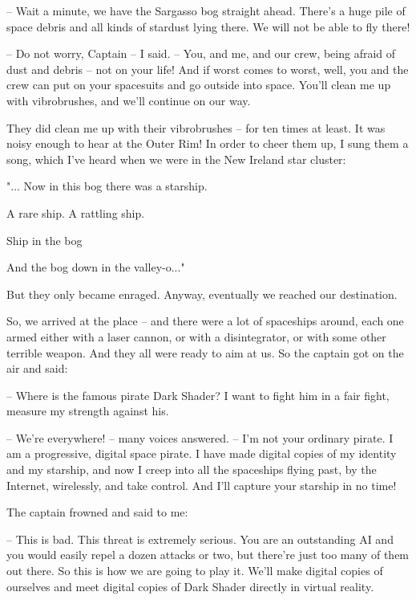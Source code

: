 \documentclass[ebook,twoside,final,openright]{memoir}
\begin{document}
– Wait a minute, we have the Sargasso bog straight ahead. There's a huge pile of space debris and all kinds of stardust lying there. We will not be able to fly there!\par
– Do not worry, Captain – I said. – You, and me, and our crew, being afraid of dust and debris – not on your life! And if worst comes to worst, well, you and the crew can put on your spacesuits and go outside into space. You’ll clean me up with vibrobrushes, and we’ll continue on our way.\par
\par
They did clean me up with their vibrobrushes – for ten times at least. It was noisy enough to hear at the Outer Rim! In order to cheer them up, I sung them a song, which I’ve heard when we were in the New Ireland star cluster: \par
"... Now in this bog there was a starship.\par
A rare ship. A rattling ship.\par
Ship in the bog\par
And the bog down in the valley-o..."\par
 But they only became enraged. Anyway, eventually we reached our destination.\par
\par
So, we arrived at the place – and there were a lot of spaceships around, each one armed either with a laser cannon, or with a disintegrator, or with some other terrible weapon. And they all were ready to aim at us. So the captain got on the air and said:\par
– Where is the famous pirate Dark Shader? I want to fight him in a fair fight, measure my strength against his.\par
– We're everywhere! – many voices answered. – I'm not your ordinary pirate. I am a progressive, digital space pirate. I have made digital copies of my identity and my starship, and now I creep into all the spaceships flying past, by the Internet, wirelessly, and take control. And I’ll capture your starship in no time!\par
\par
The captain frowned and said to me:\par
– This is bad. This threat is extremely serious. You are an outstanding AI and you would easily repel a dozen attacks or two, but there’re just too many of them out there. So this is how we are going to play it. We’ll make digital copies of ourselves and meet digital copies of Dark Shader directly in virtual reality.\par
\end{document}
